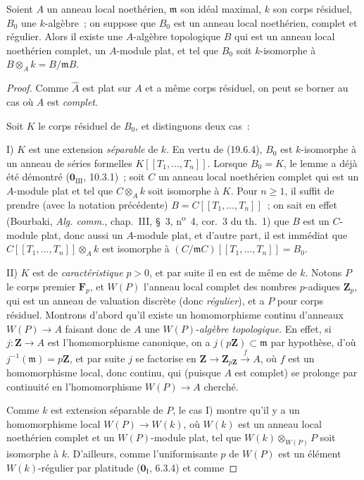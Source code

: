 \begin{lemma}[19.7.1.3]
\label{0.19.7.1.3-fr}
Soient $A$ un anneau local noethérien, $\mathfrak m$ son idéal maximal, $k$ son
corps résiduel, $B_0$ une $k$-algèbre~; on suppose que $B_0$ est un anneau
local noethérien, complet et régulier. Alors il existe une $A$-algèbre
topologique $B$ qui est un anneau local noethérien complet, un $A$-module plat,
et tel que $B_0$ soit $k$-isomorphe à
$B\otimes_A k=B/\mathfrak mB$.
\end{lemma}

\begin{proof}
Comme $\widehat A$ est plat sur $A$ et a même corps résiduel, on peut se borner
au cas où $A$ est \emph{complet}.

Soit $K$ le corps résiduel de $B_0$, et distinguons deux cas~:

\medskip
\noindent I) $K$ est une extension \emph{séparable} de $k$. En vertu de
(19.6.4), $B_0$ est $k$-isomorphe à un anneau de séries formelles
$K[[T_1,\ldots,T_n]]$. Lorsque $B_0=K$, le lemme a déjà été démontré
($\mathbf 0_{\mathrm{III}}$, 10.3.1)~; soit $C$ un anneau local noethérien
complet qui est un $A$-module plat et tel que $C\otimes_A k$ soit isomorphe à
$K$. Pour $n\geq1$, il suffit de prendre (avec la notation précédente)
$B=C[[T_1,\ldots,T_n]]$~; on sait en effet (Bourbaki,
\emph{Alg. comm.}, chap.~III, §~3, n\textsuperscript{o}~4, cor.~3 du th.~1)
que $B$ est un $C$-module plat, donc aussi un $A$-module plat, et d'autre part,
il est immédiat que $C[[T_1,\ldots,T_n]]\otimes_A k$ est isomorphe à
$(C/\mathfrak mC)[[T_1,\ldots,T_n]]=B_0$.

\medskip
\noindent II) $K$ est de \emph{caractéristique} $p>0$, et par suite il en est
de même de $k$. Notons $P$ le corps premier $\mathbf F_p$, et $W(P)$ l'anneau
local complet des nombres $p$-adiques $\mathbf Z_p$, qui est un anneau de
valuation discrète (donc \emph{régulier}), et a $P$ pour corps résiduel.
Montrons d'abord qu'il existe un homomorphisme continu d'anneaux $W(P)\to A$
faisant donc de $A$ une $W(P)$-\emph{algèbre topologique}. En effet, si
$j:\mathbf Z\to A$ est l'homomorphisme canonique, on a
$j(p\mathbf Z)\subset\mathfrak m$ par hypothèse, d'où
$j^{-1}(\mathfrak m)=p\mathbf Z$, et par suite $j$ se factorise en
$\mathbf Z\to\mathbf Z_{p\mathbf Z}\xrightarrow{f}A$, où $f$ est un
homomorphisme local, donc continu, qui (puisque $A$ est complet) se prolonge
par continuité en l'homomorphisme $W(P)\to A$ cherché.

Comme $k$ est extension séparable de $P$, le cas I) montre qu'il y a un
homomorphisme local $W(P)\to W(k)$, où $W(k)$ est un anneau local noethérien
complet et un $W(P)$-module plat, tel que $W(k)\otimes_{W(P)}P$ soit isomorphe
à $k$. D'ailleurs, comme l'uniformisante $p$ de $W(P)$ est un élément
$W(k)$-régulier par platitude ($\mathbf 0_{\mathrm I}$, 6.3.4) et comme


\end{proof}
